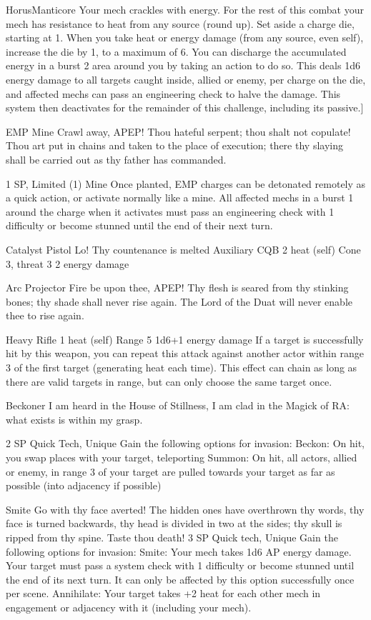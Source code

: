 \begin{mech}{Horus}{Manticore}
{Your mech crackles with energy. For the rest of this combat your mech has resistance to heat from any source (round up). Set aside a charge die, starting at 1. When you take heat or energy damage (from any source, even self), increase the die by 1, to a maximum of 6. You can discharge the accumulated energy in a burst 2 area around you by taking an action to do so. This deals 1d6 energy damage to all targets caught inside, allied or enemy, per charge on the die, and affected mechs can pass an engineering check to halve the damage. This system then deactivates for the remainder of this challenge, including its passive.}]


EMP Mine
Crawl away, APEP! Thou hateful serpent; thou shalt not copulate! Thou art put in chains and taken to the place of execution; there thy slaying shall be carried out as thy father has commanded.

1 SP, Limited (1)
Mine
Once planted, EMP charges can be detonated remotely as a quick action, or activate normally like a mine. All affected mechs in a burst 1 around the charge when it activates must pass an engineering check with 1 difficulty or become stunned until the end of their next turn.

Catalyst Pistol
Lo! Thy countenance is melted
Auxiliary CQB
2 heat (self)
Cone 3, threat 3
2 energy damage

Arc Projector
Fire be upon thee, APEP! Thy flesh is seared from thy stinking bones; thy shade shall never rise again. The Lord of the Duat will never enable thee to rise again.

Heavy Rifle
1 heat (self)
Range 5
1d6+1 energy damage
If a target is successfully hit by this weapon, you can repeat this attack against another actor within range 3 of the first target (generating heat each time). This effect can chain as long as there are valid targets in range, but can only choose the same target once.

Beckoner
I am heard in the House of Stillness, I am clad in the Magick of RA: what exists is within my grasp.

2 SP
Quick Tech, Unique
Gain the following options for invasion:
Beckon: On hit, you swap places with your target, teleporting
Summon: On hit, all actors, allied or enemy, in range 3 of your target are pulled towards your target as far as possible (into adjacency if possible)
	
Smite
Go with thy face averted! The hidden ones have overthrown thy words, thy face is turned backwards, thy head is divided in two at the sides; thy skull is ripped from thy spine. Taste thou death!
3 SP
Quick tech, Unique
Gain the following options for invasion:
	Smite: Your mech takes 1d6 AP energy damage. Your target must pass a system check with 1 difficulty or become stunned until the end of its next turn. It can only be affected by this option successfully once per scene.
Annihilate: Your target takes +2 heat for each other mech in engagement or adjacency with it (including your mech).


\end{mech}
